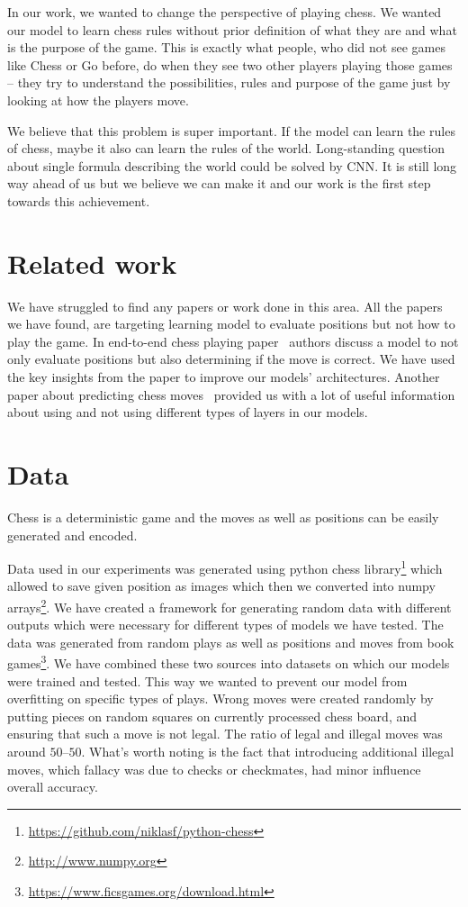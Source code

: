 \documentclass[10pt,twocolumn,letterpaper]{article}
\begin{document}
In our work, we wanted to change the perspective of playing chess. We wanted our
model to learn chess rules without prior definition of what they are and what is
the purpose of the game. This is exactly what people, who did not see games like
Chess or Go before, do when they see two other players playing those games --
they try to understand the possibilities, rules and purpose of the game just by
looking at how the players move.

We believe that this problem is super important. If the model can learn the rules of
chess, maybe it also can learn the rules of the world. Long-standing question
about single formula describing the world could be solved by CNN. It is still
long way ahead of us but we believe we can make it and our work is the first step
towards this achievement.

\section{Related work}

We have struggled to find any papers or work done in this area. All the papers
we have found, are targeting learning model to evaluate positions but not how to
play the game. In end-to-end chess playing paper~\cite{DeepChess} authors
discuss a model to not only evaluate positions but also determining if the move
is correct. We have used the key insights from the paper to improve our models'
architectures. Another paper about predicting chess
moves~\cite{Oshri2015PredictingMI} provided us with a lot of useful information about
using and not using different types of layers in our models.

\section{Data}

Chess is a deterministic game and the moves as well as positions can be easily
generated and encoded.

Data used in our experiments was generated using python chess
library\footnote{\url{https://github.com/niklasf/python-chess}} which allowed to
save given position as images which then we converted into numpy
arrays\footnote{\url{http://www.numpy.org}}. We have created a framework for
generating random data with different outputs which were necessary for different
types of models we have tested. The data was generated from random plays as well
as positions and moves from book
games\footnote{\url{https://www.ficsgames.org/download.html}}. We have combined
these two sources into datasets on which our models were trained and tested.
This way we wanted to prevent our model from overfitting on specific types of
plays. Wrong moves were created randomly by putting pieces on random squares on
currently processed chess board, and ensuring that such a move is not legal. 
The ratio of legal and illegal moves was around $50$--$50$. What's worth noting
is the fact that introducing additional illegal moves, which fallacy was due to
checks or checkmates, had minor influence overall accuracy. 
\end{document}
